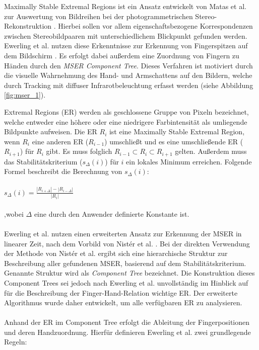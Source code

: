 Maximally Stable Extremal Regions ist ein Ansatz entwickelt von Matas et al. zur Auswertung von Bildreihen bei der photogrammetrischen Stereo-Rekonstruktion \cite{matas:2004}. Hierbei sollen vor allem eigenschaftsbezogene Korrespondenzen zwischen Stereobildpaaren mit unterschiedlichem Blickpunkt gefunden werden. Ewerling et al. nutzen diese Erkenntnisse zur Erkennung von Fingerspitzen auf dem Bildschirm \cite{ewerling:2012}. Es erfolgt dabei außerdem eine Zuordnung von Fingern zu Händen durch den \emph{MSER Component Tree}.  Dieses Verfahren ist motiviert durch die visuelle Wahrnehmung des Hand- und Armschattens auf den Bildern, welche durch Tracking mit diffuser Infrarotbeleuchtung erfasst werden (siehe Abbildung \ref{fig:mser_1}).

Extremal Regions (ER) werden als geschlossene Gruppe von Pixeln bezeichnet, welche entweder eine höhere oder eine niedrigere Farbintensität als umliegende Bildpunkte aufweisen. Die ER $R_i$ ist eine Maximally Stable Extremal Region, wenn $R_i$ eine anderen ER ($R_{i-1}$) umschließt und es eine umschließende ER ($R_{i+1}$) für $R_i$ gibt. Es muss folglich $R_{i-1} \subset R_i \subset R_{i+1}$ gelten. Außerdem muss das Stabilitätskriterium ($s_\Delta(i)$) für $i$ ein lokales Minimum erreichen. Folgende Formel beschreibt die Berechnung von $s_\Delta(i)$:
\\\\
$s_\Delta(i) = \frac{ |R_{i+\Delta}| - |R_{i-\Delta}| } { |R_i| }$
\\\\ 
,wobei $\Delta$ eine durch den Anwender definierte Konstante ist.
\\\\
Ewerling et al. nutzen einen erweiterten Ansatz zur Erkennung der MSER in linearer Zeit, nach dem Vorbild von Nistér et al. \cite{nister:2008}. Bei der direkten Verwendung der Methode von Nistér et al. ergibt sich eine hierarchische Struktur zur Beschreibung  aller gefundenen MSER, basierend auf dem Stabilitätskriterium. Genannte Struktur wird als \emph{Component Tree} bezeichnet. Die Konstruktion dieses Component Trees sei jedoch nach Ewerling et al. unvollständig im Hinblick auf für die Beschreibung der Finger-Hand-Relation wichtige ER. Der erweiterte Algorithmus wurde daher entwickelt, um alle verfügbaren ER zu analysieren.
\\\\
Anhand der ER im Component Tree erfolgt die Ableitung der Fingerpositionen und deren Handzuordnung. Hierfür definieren Ewerling et al. zwei grundlegende Regeln:

